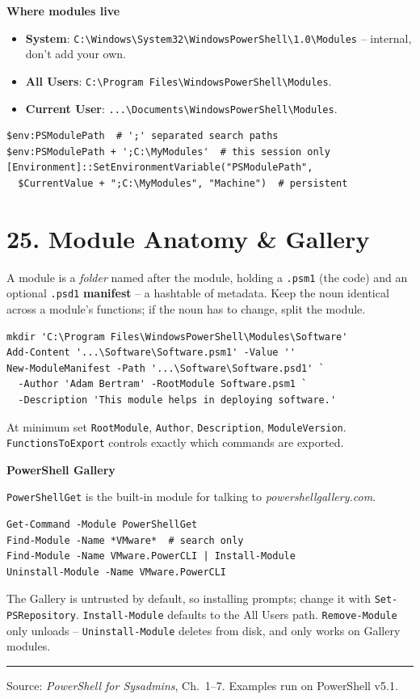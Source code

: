 \textbf{Where modules live}

\begin{itemize}
\item \textbf{System}: \texttt{C:\textbackslash Windows\textbackslash System32\textbackslash WindowsPowerShell\textbackslash 1.0\textbackslash Modules} -- internal, don't add your own.
\item \textbf{All Users}: \texttt{C:\textbackslash Program Files\textbackslash WindowsPowerShell\textbackslash Modules}.
\item \textbf{Current User}: \texttt{...\textbackslash Documents\textbackslash WindowsPowerShell\textbackslash Modules}.
\end{itemize}
\begin{verbatim}
$env:PSModulePath  # ';' separated search paths
$env:PSModulePath + ';C:\MyModules'  # this session only
[Environment]::SetEnvironmentVariable("PSModulePath",
  $CurrentValue + ";C:\MyModules", "Machine")  # persistent
\end{verbatim}

\section{25. Module Anatomy \& Gallery}
A module is a \emph{folder} named after the module, holding a \texttt{.psm1} (the code) and an optional \texttt{.psd1} \textbf{manifest} -- a hashtable of metadata. Keep the noun identical across a module's functions; if the noun has to change, split the module.
\begin{verbatim}
mkdir 'C:\Program Files\WindowsPowerShell\Modules\Software'
Add-Content '...\Software\Software.psm1' -Value ''
New-ModuleManifest -Path '...\Software\Software.psd1' `
  -Author 'Adam Bertram' -RootModule Software.psm1 `
  -Description 'This module helps in deploying software.'
\end{verbatim}
At minimum set \texttt{RootModule}, \texttt{Author}, \texttt{Description}, \texttt{ModuleVersion}. \texttt{FunctionsToExport} controls exactly which commands are exported.

\textbf{PowerShell Gallery}

\texttt{PowerShellGet} is the built-in module for talking to \emph{powershellgallery.com}.
\begin{verbatim}
Get-Command -Module PowerShellGet
Find-Module -Name *VMware*  # search only
Find-Module -Name VMware.PowerCLI | Install-Module
Uninstall-Module -Name VMware.PowerCLI
\end{verbatim}
The Gallery is untrusted by default, so installing prompts; change it with \texttt{Set-PSRepository}. \texttt{Install-Module} defaults to the All Users path. \texttt{Remove-Module} only unloads -- \texttt{Uninstall-Module} deletes from disk, and only works on Gallery modules.

\vfill
\hrule
\smallskip
{\scriptsize Source: \emph{PowerShell for Sysadmins}, Ch.\ 1--7. Examples run on PowerShell v5.1.}
